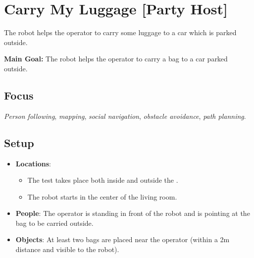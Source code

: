 \section{Carry My Luggage [Party Host]}
\label{test:carry-my-luggage}

The robot helps the operator to carry some luggage to a car which is parked outside.

\noindent \textbf{Main Goal:} The robot helps the operator to carry a bag to a car parked outside.\\


\subsection*{Focus}
\emph{Person following}, \emph{mapping}, \emph{social navigation}, \emph{obstacle avoidance}, \emph{path planning}.

\subsection*{Setup}
\begin{itemize}[nosep]
	\item \textbf{Locations}: 
		\begin{itemize}
		 \item The test takes place both inside and outside the \Arena{}.
		 \item The robot starts in the center of the living room.
		\end{itemize}
	\item \textbf{People}: The operator is standing in front of the robot and is pointing at the bag to be carried outside.
	\item \textbf{Objects}: At least two bags are placed near the operator (within a 2m distance and visible to the robot).
\end{itemize}

